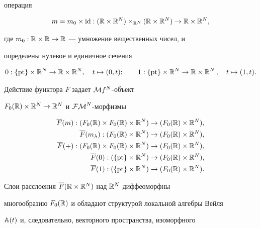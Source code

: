 операция


$$


m=m_0\times\id:(\R\times\R^N)\times_{\R^N}(\R\times\R^N)\to


\R\times\R^N,


$$


где $m_0:{\Bbb R}\times{\Bbb R}\rightarrow{\Bbb R}$ --- умножение вещественных чисел, и


определены нулевое и единичное сечения


$$


0:\{\pt\}\times\R^N\to\R\times\R^N,\quad t\mapsto(0,t);


\qquad 1:\{\pt\}\times\R^N\to\R\times\R^N\,,\quad t\mapsto(1,t).


$$


Действие функтора $\overline{F}$ задает ${\cal M} f^N$-объект


$F_0({\Bbb R})\times{\Bbb R}^N\rightarrow{\Bbb R}^N$ и ${\cal{FM}}^N$-морфизмы


\begin{equation}\label{alg}


\begin{split}


\overline{F}(m):(F_0(\R)\times F_0(\R)\times\R^N)&\to


(F_0(\R)\times\R^N),\\


\overline{F}(m_\lambda):(F_0(\R)\times\R^N)&\to


(F_0(\R)\times\R^N),\\


\overline{F}(+):(F_0(\R)\times F_0(\R)\times\R^N)&\to


(F_0(\R)\times\R^N),\\


\overline{F}(0):(\{\pt\}\times\R^N)&\to


(F_0(\R)\times\R^N),\\


\overline{F}(1):(\{\pt\}\times\R^N)&\to


(F_0(\R)\times\R^N).


\end{split}


\end{equation}


Слои расслоения $\overline{F}({\Bbb R}\times{\Bbb R}^N)$ над ${\Bbb R}^N$ диффеоморфны


многообразию  $F_0({\Bbb R})$ и обладают  структурой локальной алгебры Вейля


${\Bbb A}(t)$ и, следовательно, векторного пространства, изоморфного


